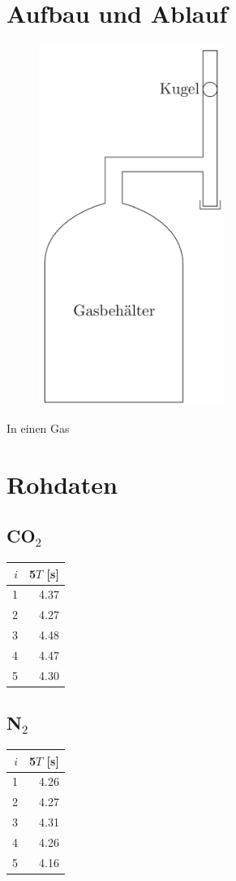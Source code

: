 \documentclass[12pt,a4paper]{article}
\begin{document}
\section*{Aufbau und Ablauf}
\begin{figure}
\vspace{-50pt}
\centering
\includegraphics[width=6cm]{illustration.pdf}
\end{figure}
In einen Gas


\section*{Rohdaten}
\subsection*{CO$_2$}
\begin{tabular}{|r|r|}
\hline
$i$&5$T$ [s]\\
\hline
1&4.37 \\
2&4.27 \\
3&4.48 \\
4&4.47 \\
5&4.30 \\
\hline
\end{tabular}

\subsection*{N$_2$}
\begin{tabular}{|r|r|}
\hline
$i$&5$T$ [s]\\
\hline
1&4.26 \\
2&4.27 \\
3&4.31 \\
4&4.26 \\
5&4.16 \\
\hline
\end{tabular}
\end{document}
